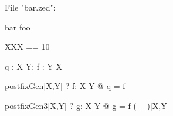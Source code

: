 
File "bar.zed":
\begin{zsection}
 \SECTION bar \parents foo
\end{zsection}

\begin{zed}
   XXX == 10
\end{zed}

\begin{gendef}[X,Y]
    q : X \fun Y; f : Y \fun X
\end{gendef}

\begin{theorem}{postfixGen}[X,Y]
   \vdash? \forall f: X \pfun Y @ q = f\inv
\end{theorem}


\begin{theorem}{postfixGen3}[X,Y]
    \vdash? \forall g: X \fun Y @ g = f (\_~\inv)[X,Y]
\end{theorem}


